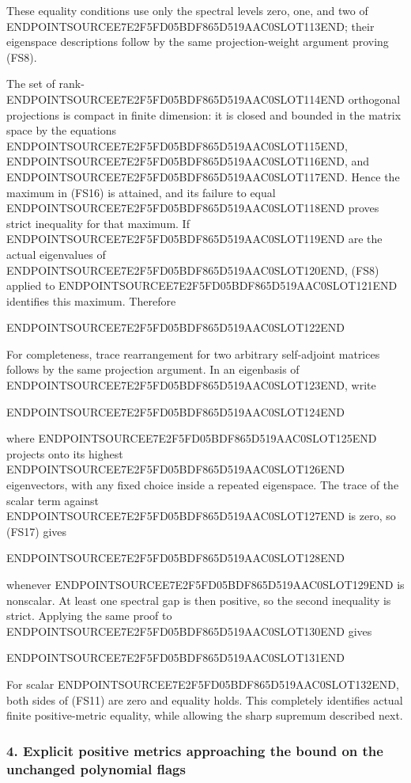 These equality conditions use only the spectral levels zero, one, and two of ENDPOINTSOURCEE7E2F5FD05BDF865D519AAC0SLOT113END; their eigenspace descriptions follow by the same projection-weight argument proving (FS8).

The set of rank-ENDPOINTSOURCEE7E2F5FD05BDF865D519AAC0SLOT114END orthogonal projections is compact in finite dimension: it is closed and bounded in the matrix space by the equations ENDPOINTSOURCEE7E2F5FD05BDF865D519AAC0SLOT115END, ENDPOINTSOURCEE7E2F5FD05BDF865D519AAC0SLOT116END, and ENDPOINTSOURCEE7E2F5FD05BDF865D519AAC0SLOT117END. Hence the maximum in (FS16) is attained, and its failure to equal ENDPOINTSOURCEE7E2F5FD05BDF865D519AAC0SLOT118END proves strict inequality for that maximum. If ENDPOINTSOURCEE7E2F5FD05BDF865D519AAC0SLOT119END are the actual eigenvalues of ENDPOINTSOURCEE7E2F5FD05BDF865D519AAC0SLOT120END, (FS8) applied to ENDPOINTSOURCEE7E2F5FD05BDF865D519AAC0SLOT121END identifies this maximum. Therefore

ENDPOINTSOURCEE7E2F5FD05BDF865D519AAC0SLOT122END

For completeness, trace rearrangement for two arbitrary self-adjoint matrices follows by the same projection argument. In an eigenbasis of ENDPOINTSOURCEE7E2F5FD05BDF865D519AAC0SLOT123END, write

ENDPOINTSOURCEE7E2F5FD05BDF865D519AAC0SLOT124END

where ENDPOINTSOURCEE7E2F5FD05BDF865D519AAC0SLOT125END projects onto its highest ENDPOINTSOURCEE7E2F5FD05BDF865D519AAC0SLOT126END eigenvectors, with any fixed choice inside a repeated eigenspace. The trace of the scalar term against ENDPOINTSOURCEE7E2F5FD05BDF865D519AAC0SLOT127END is zero, so (FS17) gives

ENDPOINTSOURCEE7E2F5FD05BDF865D519AAC0SLOT128END

whenever ENDPOINTSOURCEE7E2F5FD05BDF865D519AAC0SLOT129END is nonscalar. At least one spectral gap is then positive, so the second inequality is strict. Applying the same proof to ENDPOINTSOURCEE7E2F5FD05BDF865D519AAC0SLOT130END gives

ENDPOINTSOURCEE7E2F5FD05BDF865D519AAC0SLOT131END

For scalar ENDPOINTSOURCEE7E2F5FD05BDF865D519AAC0SLOT132END, both sides of (FS11) are zero and equality holds. This completely identifies actual finite positive-metric equality, while allowing the sharp supremum described next.

\subsubsection{4. Explicit positive metrics approaching the bound on the unchanged polynomial flags}\label{endpoint-four_window_sharpness--explicit-positive-metrics-approaching-the-bound-on-the-unchanged-polynomial-flags}

